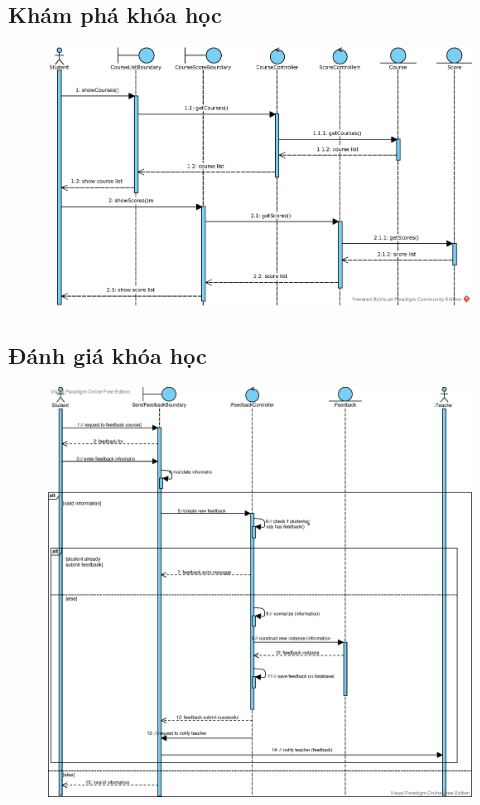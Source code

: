 \documentclass[./../main_file.tex]{subfiles}
\begin{document}
	\subsection{Khám phá khóa học }
	\begin{figure}[H]
		\centering
		\includegraphics[width=\linewidth]{./images/sequence_diagram/3_9_check_course_progress.eps}
	\end{figure}
	
	\subsection{Đánh giá khóa học}
	\begin{figure}[H]
		\centering
		\includegraphics[width=\linewidth]{./images/sequence_diagram/3_10_feedbackcourse.eps}
	\end{figure}
	
\end{document}
